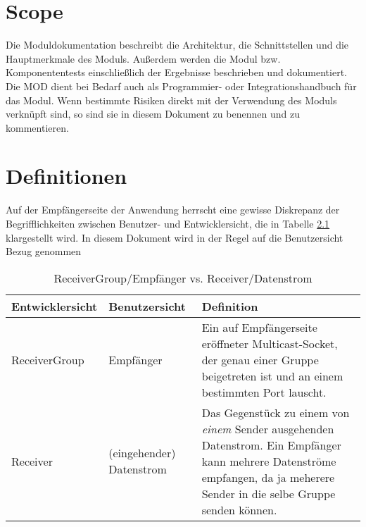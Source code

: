 
\chapter{Scope}
Die Moduldokumentation beschreibt die Architektur, die Schnittstellen 
und die Hauptmerkmale des Moduls. Außerdem werden die Modul bzw. Komponententests 
einschließlich der Ergebnisse beschrieben und dokumentiert. 
Die MOD dient bei Bedarf auch als Programmier- oder Integrationshandbuch für das 
Modul. Wenn bestimmte Risiken direkt mit der Verwendung des Moduls verknüpft sind,
so sind sie in diesem Dokument zu benennen und zu kommentieren.

\chapter{Definitionen}

    Auf der Empfängerseite der Anwendung herrscht eine gewisse Diskrepanz der
    Begrifflichkeiten zwischen Benutzer- und Entwicklersicht, die in Tabelle
    \ref{tab:receiver_vs_group} klargestellt wird. In diesem Dokument wird
    in der Regel auf die Benutzersicht Bezug genommen
    
    \begin{table}[h]
        \caption{ReceiverGroup/Empfänger vs. Receiver/Datenstrom}
        \label{tab:receiver_vs_group}
        \begin{center}
            \begin{tabular}{|p{3.2cm}|p{3.5cm}|p{7.5cm}|}
                \hline
                    \textbf{Entwicklersicht} &
                    \textbf{Benutzersicht} &
                    \textbf{Definition}\\
                \hline
                    ReceiverGroup & Empfänger & Ein auf Empfängerseite
                    eröffneter Multicast-Socket, der genau einer Gruppe
                    beigetreten ist und an einem bestimmten Port lauscht.\\
                \hline
                    Receiver & (eingehender) Datenstrom & Das Gegenstück zu
                    einem von \emph{einem} Sender ausgehenden Datenstrom. Ein
                    Empfänger kann mehrere Datenströme empfangen, da ja
                    meherere Sender in die selbe Gruppe senden können.\\
                \hline
            \end{tabular}
        \end{center}
    \end{table}

